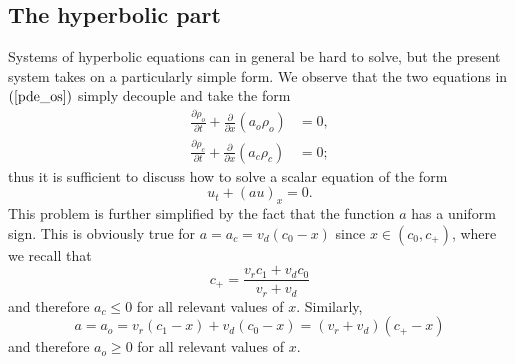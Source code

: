 \subsection{The hyperbolic part}
Systems of hyperbolic equations can
in general be hard to solve, but the present system takes on a particularly
simple form. We observe that the two equations in $\left( \ref{pde_os}
\right)  $ simply decouple and take the form
\begin{align}
\frac{\partial\rho_{o}}{\partial t}+\frac{\partial}{\partial x}\left(
a_{o}\rho_{o}\right)   &  =0,\label{os_600}\\
\frac{\partial\rho_{c}}{\partial t}+\frac{\partial}{\partial x}\left(
a_{c}\rho_{c}\right)   &  =0;\nonumber
\end{align}
thus it is sufficient to discuss how to solve a scalar equation of the form
\begin{equation}
u_{t}+\left(  au\right)  _{x}=0.\label{os_601}
\end{equation}
This problem is further simplified by the fact that the function $a$ has a
uniform sign. This is obviously true for $a=a_{c}=v_{d}(c_{0}-x)$ since
$x\in\left(  c_{0},c_{+}\right)$, where we recall that
\begin{equation}
c_{+}=\frac{v_{r}c_{1}+v_{d}c_{0}}{v_{r}+v_{d}}
\end{equation}
and therefore $a_{c}\leq0$ for all relevant values of $x.$ Similarly,
\begin{equation}
a=a_{o}=v_{r}(c_{1}-x)+v_{d}(c_{0}-x)=\left(  v_{r}+v_{d}\right)  \left(
c_{+}-x\right)
\end{equation}
and therefore $a_{o}\geq0$ for all relevant values of $x.$

